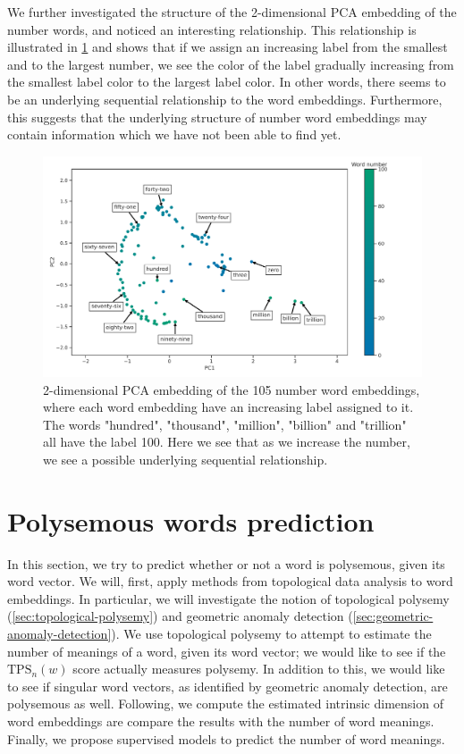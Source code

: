 We further investigated the structure of the 2-dimensional PCA embedding of the number words, and noticed an interesting relationship. This relationship is illustrated in \cref{fig:ordered-number-word-embeddings-2d-pca} and shows that if we assign an increasing label from the smallest and to the largest number, we see the color of the label gradually increasing from the smallest label color to the largest label color. In other words, there seems to be an underlying sequential relationship to the word embeddings. Furthermore, this suggests that the underlying structure of number word embeddings may contain information which we have not been able to find yet.
\begin{figure}[H]
    \centering
    \includegraphics[width=\textwidth]{thesis/figures/ordered-number-word-embeddings-2d-pca.pdf}
    \caption{2-dimensional PCA embedding of the 105 number word embeddings, where each word embedding have an increasing label assigned to it. The words "hundred", "thousand", "million", "billion" and "trillion" all have the label 100. Here we see that as we increase the number, we see a possible underlying sequential relationship.}
    \label{fig:ordered-number-word-embeddings-2d-pca}
\end{figure}

\section{Polysemous words prediction}
\label{sec:analysis-of-embeddings-tda}
In this section, we try to predict whether or not a word is polysemous, given its word vector. We will, first, apply methods from topological data analysis to word embeddings. In particular, we will investigate the notion of topological polysemy (\cref{sec:topological-polysemy}) and geometric anomaly detection (\cref{sec:geometric-anomaly-detection}). We use topological polysemy to attempt to estimate the number of meanings of a word, given its word vector; we would like to see if the $\text{TPS}_n(w)$ score actually measures polysemy. In addition to this, we would like to see if singular word vectors, as identified by geometric anomaly detection, are polysemous as well. Following, we compute the estimated intrinsic dimension of word embeddings are compare the results with the number of word meanings. Finally, we propose supervised models to predict the number of word meanings.

